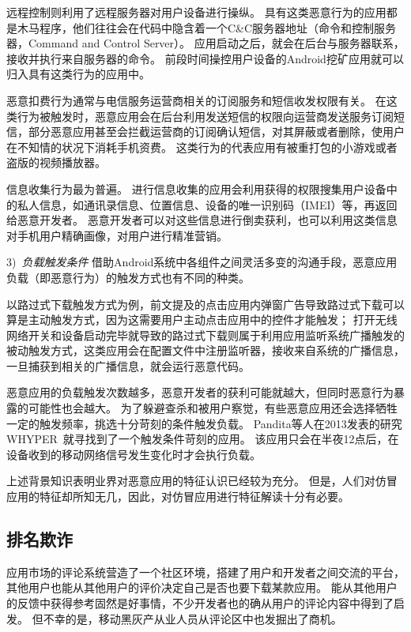 远程控制则利用了远程服务器对用户设备进行操纵。
具有这类恶意行为的应用都是木马程序，他们往往会在代码中隐含着一个C\&C服务器地址（命令和控制服务器，Command and Control Server）。
应用启动之后，就会在后台与服务器联系，接收并执行来自服务器的命令。
前段时间操控用户设备的Android挖矿应用就可以归入具有这类行为的应用中。

恶意扣费行为通常与电信服务运营商相关的订阅服务和短信收发权限有关。
在这类行为被触发时，恶意应用会在后台利用发送短信的权限向运营商发送服务订阅短信，部分恶意应用甚至会拦截运营商的订阅确认短信，对其屏蔽或者删除，使用户在不知情的状况下消耗手机资费。
这类行为的代表应用有被重打包的小游戏或者盗版的视频播放器。

信息收集行为最为普遍。
进行信息收集的应用会利用获得的权限搜集用户设备中的私人信息，如通讯录信息、位置信息、设备的唯一识别码（IMEI）等，再返回给恶意开发者。
恶意开发者可以对这些信息进行倒卖获利，也可以利用这类信息对手机用户精确画像，对用户进行精准营销。

3)\ \emph{负载触发条件} \quad
借助Android系统中各组件之间灵活多变的沟通手段，恶意应用负载（即恶意行为）的触发方式也有不同的种类。

以路过式下载触发方式为例，前文提及的点击应用内弹窗广告导致路过式下载可以算是主动触发方式，因为这需要用户主动点击应用中的控件才能触发；
打开无线网络开关和设备启动完毕就导致的路过式下载则属于利用应用监听系统广播触发的被动触发方式，这类应用会在配置文件中注册监听器，接收来自系统的广播信息，一旦捕获到相关的广播信息，就会运行恶意代码。

恶意应用的负载触发次数越多，恶意开发者的获利可能就越大，但同时恶意行为暴露的可能性也会越大。
为了躲避查杀和被用户察觉，有些恶意应用还会选择牺牲一定的触发频率，挑选十分苛刻的条件触发负载。
Pandita等人在2013发表的研究WHYPER~\cite{pandita2013whyper}就寻找到了一个触发条件苛刻的应用。
该应用只会在半夜12点后，在设备收到的移动网络信号发生变化时才会执行负载。

上述背景知识表明业界对恶意应用的特征认识已经较为充分。
但是，人们对仿冒应用的特征却所知无几，因此，对仿冒应用进行特征解读十分有必要。

\subsection{排名欺诈}
应用市场的评论系统营造了一个社区环境，搭建了用户和开发者之间交流的平台，其他用户也能从其他用户的评价决定自己是否也要下载某款应用。
能从其他用户的反馈中获得参考固然是好事情，不少开发者也的确从用户的评论内容中得到了启发。
但不幸的是，移动黑灰产从业人员从评论区中也发掘出了商机。

